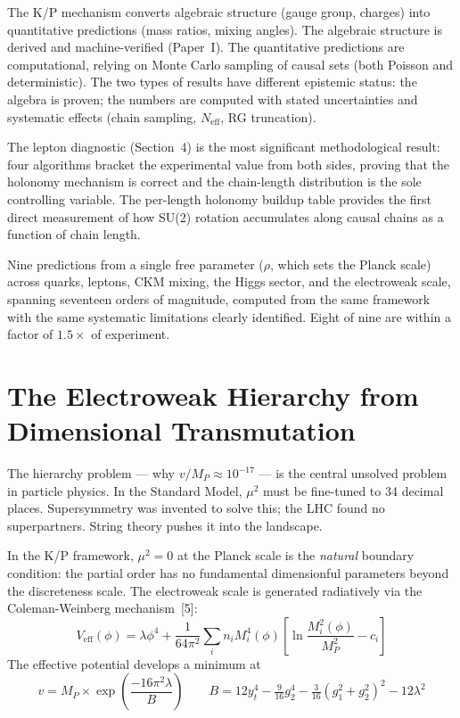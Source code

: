 \documentclass[11pt,letterpaper]{article}
\begin{document}
The K/P mechanism converts algebraic structure (gauge group, charges)
into quantitative predictions (mass ratios, mixing angles). The
algebraic structure is derived and machine-verified (Paper~I). The
quantitative predictions are computational, relying on Monte Carlo
sampling of causal sets (both Poisson and deterministic).
The two types of results have different epistemic status: the algebra is
proven; the numbers are computed with stated uncertainties and systematic
effects (chain sampling, $N_{\mathrm{eff}}$, RG truncation).

The lepton diagnostic (Section~4) is the most significant methodological
result: four algorithms bracket the experimental value from both sides,
proving that the holonomy mechanism is correct and the chain-length
distribution is the sole controlling variable.  The per-length holonomy
buildup table provides the first direct measurement of how SU(2) rotation
accumulates along causal chains as a function of chain length.

Nine predictions from a single free parameter ($\rho$, which sets
the Planck scale) across quarks, leptons, CKM mixing,
the Higgs sector, and the electroweak scale,
spanning seventeen orders of magnitude, computed from the same
framework with the same systematic limitations clearly identified.
Eight of nine are within a factor of $1.5\times$ of experiment.

\section{The Electroweak Hierarchy from Dimensional Transmutation}

The hierarchy problem --- why $v/M_P \approx 10^{-17}$ --- is the
central unsolved problem in particle physics.  In the Standard Model,
$\mu^2$ must be fine-tuned to 34 decimal places.  Supersymmetry was
invented to solve this; the LHC found no superpartners.  String
theory pushes it into the landscape.

In the K/P framework, $\mu^2 = 0$ at the Planck scale is the
\emph{natural} boundary condition: the partial order has no
fundamental dimensionful parameters beyond the discreteness scale.
The electroweak scale is generated radiatively via the
Coleman-Weinberg mechanism~[5]:
\[
  V_{\mathrm{eff}}(\phi) = \lambda\phi^4 +
  \frac{1}{64\pi^2} \sum_i n_i M_i^4(\phi)
  \left[\ln\frac{M_i^2(\phi)}{M_P^2} - c_i\right]
\]
The effective potential develops a minimum at
\[
  v = M_P \times \exp\!\left(\frac{-16\pi^2\lambda}{B}\right)
  \qquad B = 12 y_t^4 - \tfrac{9}{16}g_2^4
  - \tfrac{3}{16}(g_1^2 + g_2^2)^2 - 12\lambda^2
\]
\end{document}

